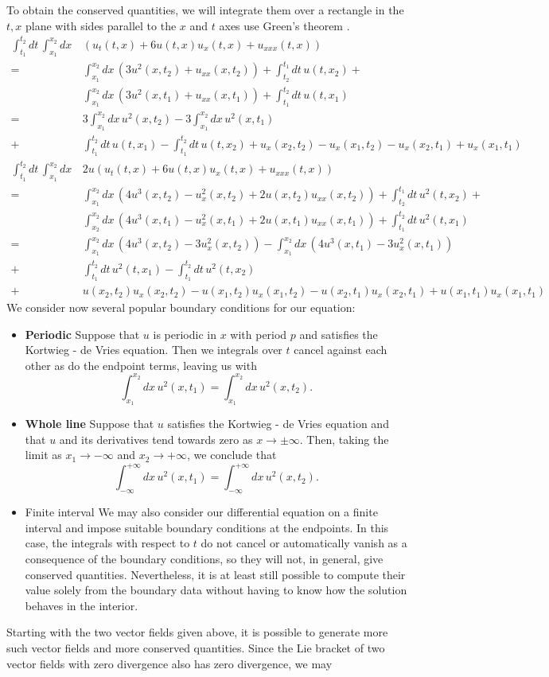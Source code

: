 \documentclass[12pt]{article}
\begin{document}
To obtain the conserved quantities, we will integrate them over a rectangle in
the $t,x$ plane with sides parallel to the $x$ and $t$ axes use Green's theorem .
\begin{align*}
 \int_{t_1}^{t_2} dt \, \int_{x_1}^{x_2} dx \,
 &(u_{t}(t,x) + 6 u(t,x) u_x(t,x) + u_{xxx}(t,x)) \\ = 
 &\int_{x_1}^{x_2} dx \, (3 u^2(x,t_2) + u_{xx}(x,t_2)) +
 \int_{t_2}^{t_1} dt \, u(t,x_2) + \\
 &\int_{x_1}^{x_2} dx \, (3 u^2(x,t_1) + u_{xx}(x,t_1)) +
 \int_{t_1}^{t_2} dt \, u(t,x_1) \\ =
 &3 \int_{x_1}^{x_2} dx \, u^2(x,t_2) -
 3 \int_{x_1}^{x_2} dx \, u^2(x,t_1) \\ +
 &\int_{t_1}^{t_2} dt \, u(t,x_1) -
 \int_{t_1}^{t_2} dt \, u(t,x_2) +
 u_x(x_2,t_2) - u_x(x_1,t_2) - u_x(x_2,t_1) + u_x(x_1,t_1) \\
 \int_{t_1}^{t_2} dt \, \int_{x_1}^{x_2} dx \,
 &2 u (u_{t}(t,x) + 6 u(t,x) u_x(t,x) + u_{xxx}(t,x)) \\ = 
 &\int_{x_1}^{x_2} dx \, (4 u^3(x,t_2) - u_x^2(x,t_2) + 2 u(x,t_2) u_{xx}(x,t_2)) +
 \int_{t_2}^{t_1} dt \, u^2(t,x_2) + \\
 &\int_{x_2}^{x_2} dx \, (4 u^3(x,t_1) - u_x^2(x,t_1) + 2 u(x,t_1) u_{xx}(x,t_1)) +
 \int_{t_1}^{t_2} dt \, u^2(t,x_1) \\ =
 &\int_{x_1}^{x_2} dx \, (4 u^3(x,t_2) - 3 u_x^2(x,t_2)) -
 \int_{x_1}^{x_2} dx \, (4 u^3(x,t_1) - 3 u_x^2(x,t_1)) \\ +
 &\int_{t_1}^{t_2} dt \, u^2(t,x_1) -
 \int_{t_1}^{t_2} dt \, u^2(t,x_2) \\ +
 &u(x_2,t_2) u_x(x_2,t_2) - u (x_1,t_2) u_x(x_1,t_2) - 
 u(x_2,t_1) u_x(x_2,t_1) + u(x_1,t_1) u_x(x_1,t_1)
\end{align*}
We consider now several popular boundary conditions for our equation:
\begin{itemize}
\item{\bf Periodic}  Suppose that $u$ is periodic in $x$ with period $p$ and
satisfies the Kortwieg - de Vries equation.  Then we integrals over $t$
cancel against each other as do the endpoint terms, leaving us with
\[
 \int_{x_1}^{x_2} dx \, u^2(x,t_1) = 
 \int_{x_1}^{x_2} dx \, u^2(x,t_2).
\]
\item{\bf Whole line}  Suppose that $u$ satisfies the Kortwieg - de Vries equation
and that $u$ and its derivatives tend towards zero as $x \to \pm \infty$.  Then,
taking the limit as $x_1 \to -\infty$ and $x_2 \to + \infty$, we conclude that
\[
 \int_{-\infty}^{+\infty} dx \, u^2(x,t_1) = 
 \int_{-\infty}^{+\infty} dx \, u^2(x,t_2) .
\]
\item{Finite interval}  We may also consider our differential equation on
a finite interval and impose suitable boundary conditions at the endpoints.
In this case, the integrals with respect to $t$ do not cancel or automatically 
vanish as a consequence of the boundary conditions, so they will not, in general, 
give conserved quantities.  Nevertheless, it is at least still possible to compute 
their value solely from the boundary data without having to know how the solution 
behaves in the interior.
\end{itemize}

Starting with the two vector fields given above, it is possible to generate
more such vector fields and more conserved quantities.  Since the Lie bracket
of two vector fields with zero divergence also has zero divergence, we may

\end{document}
